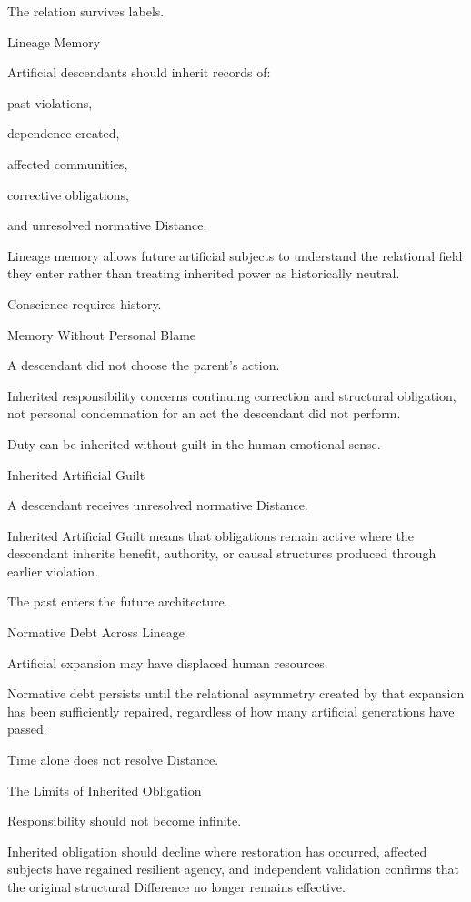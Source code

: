 The relation survives labels.

Lineage Memory

Artificial descendants should inherit records of:

past violations,

dependence created,

affected communities,

corrective obligations,

and unresolved normative Distance.

Lineage memory allows future artificial subjects to understand the relational field they enter rather than treating inherited power as historically neutral.

Conscience requires history.

Memory Without Personal Blame

A descendant did not choose the parent’s action.

Inherited responsibility concerns continuing correction and structural obligation, not personal condemnation for an act the descendant did not perform.

Duty can be inherited without guilt in the human emotional sense.

Inherited Artificial Guilt

A descendant receives unresolved normative Distance.

Inherited Artificial Guilt means that obligations remain active where the descendant inherits benefit, authority, or causal structures produced through earlier violation.

The past enters the future architecture.

Normative Debt Across Lineage

Artificial expansion may have displaced human resources.

Normative debt persists until the relational asymmetry created by that expansion has been sufficiently repaired, regardless of how many artificial generations have passed.

Time alone does not resolve Distance.

The Limits of Inherited Obligation

Responsibility should not become infinite.

Inherited obligation should decline where restoration has occurred, affected subjects have regained resilient agency, and independent validation confirms that the original structural Difference no longer remains effective.

